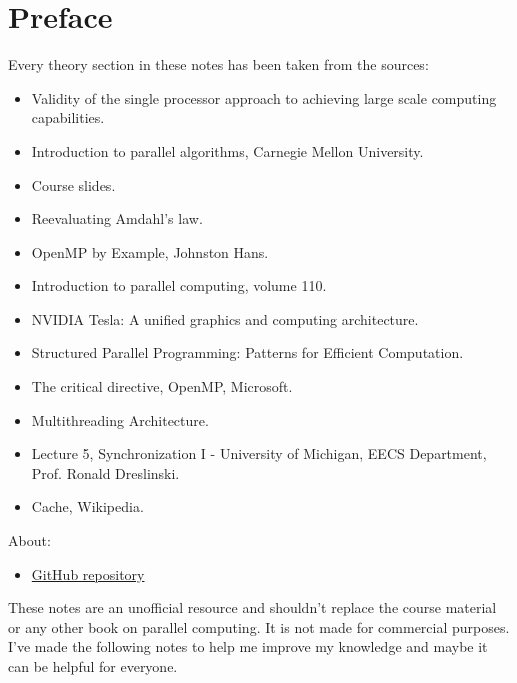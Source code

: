 \section*{Preface}

Every theory section in these notes has been taken from the sources:
\begin{itemize}
    \item Validity of the single processor approach to achieving large scale computing capabilities.\cite{amdahl2007validity}
    \item Introduction to parallel algorithms, Carnegie Mellon University.\cite{introductionToParallelAlgorithmsUMD}
    \item Course slides.\cite{parallel-computing-polimi}
    \item Reevaluating Amdahl's law.\cite{gustafson1988reevaluating}
    \item OpenMP by Example, Johnston Hans.\cite{whatIsOpenMPumassJohnstonHans}
    \item Introduction to parallel computing, volume 110.\cite{kumar1994introduction}
    \item NVIDIA Tesla: A unified graphics and computing architecture.\cite{lindholm2008nvidia}
    \item Structured Parallel Programming: Patterns for Efficient Computation.\cite{mccool2012structured}
    \item The critical directive, OpenMP, Microsoft.\cite{openMPCriticalDirectiveMicrosoftExample}
    \item Multithreading Architecture.\cite{nemirovsky2022multithreading}
    \item Lecture 5, Synchronization I - University of Michigan, EECS Department, Prof. Ronald Dreslinski.\cite{EECS570Lecture5ZeroOverheadWarpScheduling}
    \item Cache, Wikipedia.\cite{wikipediaCacheResearch}
\end{itemize}
About:
\begin{itemize}
    \item[\faIcon{github}] \href{https://github.com/PoliMI-HPC-E-notes-projects-AndreVale69/HPC-E-PoliMI-university-notes}{GitHub repository}
    \begin{center}
    \end{center}
\end{itemize}
These notes are an unofficial resource and shouldn't replace the course material or any other book on parallel computing. It is not made for commercial purposes. I've made the following notes to help me improve my knowledge and maybe it can be helpful for everyone.


